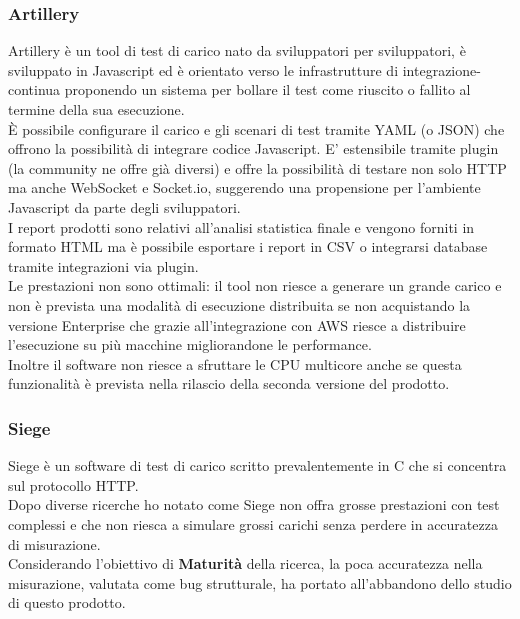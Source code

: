 \subsubsection{Artillery}
Artillery è un tool di test di carico nato da sviluppatori per sviluppatori, è sviluppato in Javascript ed è orientato verso le infrastrutture di \gls{integrazione-continua} proponendo un sistema per bollare il test come riuscito o fallito al termine della sua esecuzione. \\
È possibile configurare il carico e gli scenari di test tramite YAML (o JSON) che offrono la possibilità di integrare codice Javascript.
E’ estensibile tramite \gls{plugin} (la community ne offre già diversi) e offre la possibilità di testare non solo HTTP ma anche WebSocket e Socket.io, suggerendo una propensione per l’ambiente Javascript da parte degli sviluppatori. \\
I report prodotti sono relativi all’analisi statistica finale e vengono forniti in formato HTML ma è possibile esportare i report in CSV o integrarsi database tramite integrazioni via \gls{plugin}. \\
Le prestazioni non sono ottimali: il tool non riesce a generare un grande carico e non è prevista una modalità di esecuzione distribuita se non acquistando la versione Enterprise che grazie all’integrazione con AWS riesce a distribuire l’esecuzione su più macchine migliorandone le performance. \\
Inoltre il software non riesce a sfruttare le CPU multicore anche se questa funzionalità è prevista nella rilascio della seconda versione del prodotto.
\subsubsection{Siege}
Siege è un software di test di carico scritto prevalentemente in C che si concentra sul protocollo HTTP.\\
Dopo diverse ricerche ho notato come Siege non offra grosse prestazioni con test complessi e che non riesca a simulare grossi carichi senza perdere in accuratezza di misurazione.\\
Considerando l'obiettivo di \textbf{Maturità} della ricerca, la poca accuratezza nella misurazione, valutata come bug strutturale, ha portato all'abbandono dello studio di questo prodotto.
